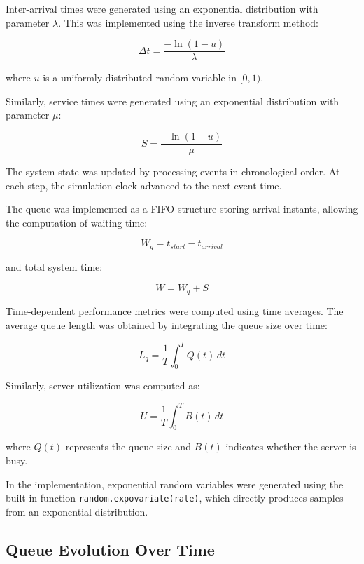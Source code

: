 \documentclass[12pt]{article}
\begin{document}
Inter-arrival times were generated using an exponential distribution with parameter $\lambda$. This was implemented using the inverse transform method:

\begin{equation}
\Delta t = \frac{-\ln(1-u)}{\lambda}
\end{equation}

where $u$ is a uniformly distributed random variable in $[0,1)$.

Similarly, service times were generated using an exponential distribution with parameter $\mu$:

\begin{equation}
S = \frac{-\ln(1-u)}{\mu}
\end{equation}

The system state was updated by processing events in chronological order. At each step, the simulation clock advanced to the next event time.

The queue was implemented as a FIFO structure storing arrival instants, allowing the computation of waiting time:

\begin{equation}
W_q = t_{start} - t_{arrival}
\end{equation}

and total system time:

\begin{equation}
W = W_q + S
\end{equation}

Time-dependent performance metrics were computed using time averages. The average queue length was obtained by integrating the queue size over time:

\begin{equation}
L_q = \frac{1}{T} \int_0^T Q(t)\,dt
\end{equation}

Similarly, server utilization was computed as:

\begin{equation}
U = \frac{1}{T} \int_0^T B(t)\,dt
\end{equation}

where $Q(t)$ represents the queue size and $B(t)$ indicates whether the server is busy.

In the implementation, exponential random variables were generated using the built-in function \texttt{random.expovariate(rate)}, which directly produces samples from an exponential distribution.

\subsection{Queue Evolution Over Time}
\end{document}
